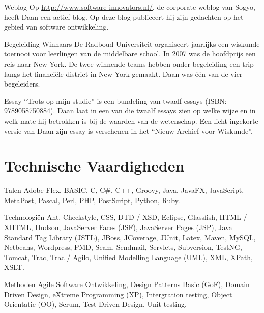 	\begin{subActivityList}
		\item[Weblog] Op \url{http://www.software-innovators.nl/}, de corporate
		weblog van Sogyo, heeft Daan een actief blog. Op deze blog publiceert 
		hij zijn gedachten op het gebied van software ontwikkeling.
		\hfill\\
		
		\item[Begeleiding Winnaars] De Radboud Universiteit organiseert 
		jaarlijks een wiskunde toernooi voor leerlingen van de middelbare 
		school. In 2007 was de hoofdprijs een reis naar New York. De twee 
		winnende teams hebben onder begeleiding een trip langs het financi\"ele 
		district in New York gemaakt. Daan was \'e\'en van de vier begeleiders.
		\hfill\\
		
		\item[Essay] ``Trots op mijn studie'' is een bundeling van twaalf essays 
		(ISBN: 9789058750884). Daan laat in een van die twaalf essays zien op 
		welke wijze en in welk mate hij betrokken is bij de waarden van de 
		wetenschap.
		Een licht ingekorte versie van Daan zijn essay is verschenen in het 
		``Nieuw Archief voor Wiskunde''.		
		\hfill\\
	\end{subActivityList}

\section*{Technische Vaardigheden}

	\begin{skillList}
		\item[Talen] Adobe Flex, BASIC, C, C\#, C++, Groovy, Java, JavaFX,
		JavaScript, MetaPost, Pascal, Perl, PHP, PostScript, Python, Ruby.
		\hfill\\
		
		\item[Technologi\"en] Ant, Checkstyle, CSS, DTD / XSD, Eclipse, Glassfish, 
		HTML / XHTML, Hudson, JavaServer Faces (JSF), JavaServer Pages (JSP), 
		Java Standard Tag Library (JSTL), JBoss, JCoverage, JUnit, Latex, Maven,
		MySQL, Netbeans, Wordpress, PMD, Seam, Sendmail, Servlets, Subversion,
		TestNG, Tomcat, Trac, Trac / Agilo, Unified Modelling Language (UML), XML,
		XPath, XSLT.
		\hfill\\
		
		\item[Methoden] Agile Software Ontwikkeling, Design Patterns Basic 
		(GoF), Domain Driven Design, eXtreme Programming (XP), Intergration testing,
		Object Orientatie (OO), Scrum, Test Driven Design, Unit testing.
		\hfill\\
		
	\end{skillList}

